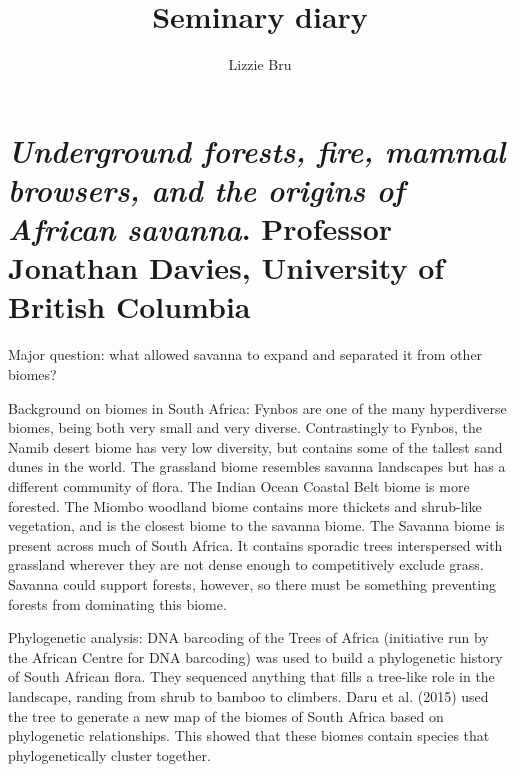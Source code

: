 \documentclass[9pt]{article}
\title{\textbf{Seminary diary}}
\author[1]{Lizzie Bru}
\affil[1]{School of Life Sciences, Imperial College London, Silwood Park Campus, Ascot SL5 7PY, UK}
\date{}
\begin{document}
	
	\maketitle
	
	\newpage
	
	\section{\textit{Underground forests, fire, mammal browsers, and the origins of African savanna}. Professor Jonathan Davies, University of British Columbia}
	
	Major question: what allowed savanna to expand and separated it from other biomes?
	
	Background on biomes in South Africa: Fynbos are one of the many hyperdiverse biomes, being both very small and very diverse. Contrastingly to Fynbos, the Namib desert biome has very low diversity, but contains some of the tallest sand dunes in the world. The grassland biome resembles savanna landscapes but has a different community of flora. The Indian Ocean Coastal Belt biome is more forested. The Miombo woodland biome contains more thickets and shrub-like vegetation, and is the closest biome to the savanna biome. The Savanna biome is present across much of South Africa. It contains sporadic trees interspersed with grassland wherever they are not dense enough to competitively exclude grass. Savanna could support forests, however, so there must be something preventing forests from dominating this biome.
	
	Phylogenetic analysis: DNA barcoding of the Trees of Africa (initiative run by the African Centre for DNA barcoding) was used to build a phylogenetic history of South African flora. They sequenced anything that fills a tree-like role in the landscape, randing from shrub to bamboo to climbers. Daru et al. (2015) used the tree to generate a new map of the biomes of South Africa based on phylogenetic relationships. This showed that these biomes contain species that phylogenetically cluster together.
	
\end{document}
